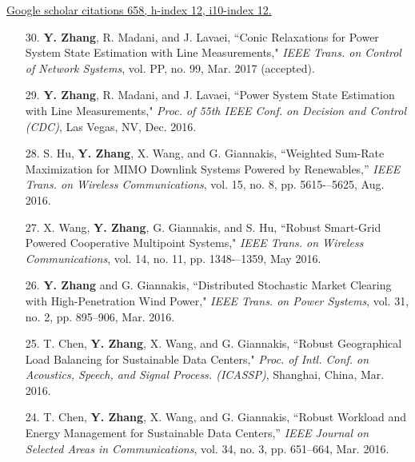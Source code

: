\documentclass[margin,line]{res}
\begin{document}
\begin{resume}
{\href{https://scholar.google.com/citations?user=mt3m9bIAAAAJ&hl=en/}{Google scholar citations 658, h-index 12, i10-index 12.}}
\vspace{.2cm}

\begin{enumerate}\setcounter{enumi}{\value{saveenum}}





\item[30.] \textbf{Y. Zhang}, R. Madani, and J. Lavaei,
``Conic Relaxations for Power System State Estimation with Line Measurements,"
\emph{IEEE Trans. on Control of Network Systems}, vol. PP, no. 99, Mar. 2017 (accepted).

\item[29.] \textbf{Y. Zhang}, R. Madani, and J. Lavaei,
``Power System State Estimation with Line Measurements,"
\emph{Proc. of 55th IEEE Conf. on Decision and Control (CDC)}, Las Vegas, NV, Dec. 2016.


\item[28.] S. Hu, \textbf{Y. Zhang}, X. Wang, and G. Giannakis,
``Weighted Sum-Rate Maximization for MIMO Downlink Systems Powered by Renewables,''
\emph{IEEE Trans. on Wireless Communications}, vol. 15, no. 8, pp. 5615-–5625, Aug. 2016.


\item[27.] X. Wang, \textbf{Y. Zhang}, G. Giannakis, and S. Hu,
``Robust Smart-Grid Powered Cooperative Multipoint Systems,"
\emph{IEEE Trans. on Wireless Communications}, vol. 14, no. 11, pp. 1348-–1359, May 2016.


\item[26.] \textbf{Y. Zhang} and G. Giannakis,
``Distributed Stochastic Market Clearing with High-Penetration Wind Power,"
\emph{IEEE Trans. on Power Systems}, vol. 31, no. 2, pp. 895--906, Mar. 2016.


\item[25.] T. Chen, \textbf{Y. Zhang}, X. Wang, and G. Giannakis,
``Robust Geographical Load Balancing for Sustainable Data Centers,"
\emph{Proc. of Intl. Conf. on Acoustics, Speech, and Signal Process. (ICASSP)}, Shanghai, China, Mar. 2016.

\item[24.] T. Chen, \textbf{Y. Zhang}, X. Wang, and G. Giannakis,
``Robust Workload and Energy Management for Sustainable Data Centers,''
\emph{IEEE Journal on Selected Areas in Communications}, vol. 34, no. 3, pp. 651--664, Mar. 2016.



\end{enumerate}
\end{resume}
\end{document}
